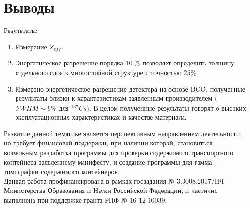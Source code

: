 \documentclass[a4paper]{panl}
\begin{document}
\section*{Выводы}
Результаты:   
    \begin{enumerate}
        \item Измерение  $Z_{eff}$.
        \item Энергетическое разрешение порядка 10 \% позволяет определить толщину отдельного слоя в многослойной структуре с точностью 25\%.
        \item Измерено энергетическое разрешение детектора на основе BGO, полученные результаты близки к характеристикам заявленным производителем ( $FWHM \sim 9\%$ для $^{137}Cs$). В целом полученные результаты говорят о высоких эксплуатационных характеристиках и качестве материала.
    \end{enumerate}
Развитие данной тематике является перспективным направлением деятельности, но требует финансовой поддержки, при наличии которой, становиться возможным разработка программы для проверки содержимого транспортного контейнера заявленному манифесту, и создание программы для гамма-томографии содержимого контейнеров.\\
Данная работа профинансирована в рамках госзадания № 3.3008.2017/ПЧ Министерства Образования и Науки Российской Федерации, и частично выполнена при поддержке гранта РНФ № 16-12-10039.


\end{document}
